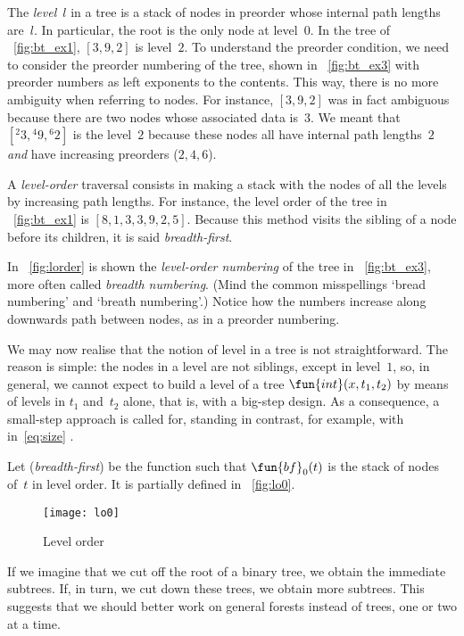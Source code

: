
The \emph{level}~\(l\) in a tree is a stack of nodes
in preorder whose internal path lengths
are~\(l\). In particular, the root is
the only node at level~\(0\). In the tree of \fig~\vref{fig:bt_ex1},
\([3,9,2]\) is level~\(2\). To understand the preorder condition, we
need to consider the preorder numbering of the tree, shown in
\fig~\vref{fig:bt_ex3} with preorder numbers as left exponents to the
contents. This way, there is no more ambiguity when referring to
nodes. For instance, \([3,9,2]\) was in fact ambiguous because there
are two nodes whose associated data is~\(3\). We meant that
\([{}^{2}{3}, {}^{4}{9}, {}^{6}{2}]\) is the level~\(2\) because these
nodes all have internal path lengths~\(2\) \emph{and} have increasing
preorders (\(2,4,6\)).

A \emph{level-order} traversal consists
in making a stack with the nodes of all the levels by increasing path
lengths. For instance, the level order of the tree in
\fig~\vref{fig:bt_ex1} is \([8,1,3,3,9,2,5]\). Because this method
visits the sibling of a node before its children, it is said
\emph{breadth\hyp{}first}.

In \fig~\vref{fig:lorder} is shown the \emph{level\hyp{}order
  numbering} of the tree in \fig~\vref{fig:bt_ex3}, more often called
\emph{breadth numbering}.   (Mind
the common misspellings `bread numbering' and `breath numbering'.)
Notice how the numbers increase along downwards path between nodes, as
in a preorder numbering.

We may now realise that the notion of level in a tree is not
straightforward. The reason is simple: the nodes in a level are not
siblings, except in level~\(1\), so, in
general, we cannot expect to build a level of a tree
\(\fun{int}(x,t_1,t_2)\) by means of levels in \(t_1\) and~\(t_2\)
alone, that is, with a big\hyp{}step design. As a consequence, a small\hyp{}step approach is called for,
standing in contrast, for example, with
 in~\eqref{eq:size}
.

Let 
(\emph{breadth\hyp{}first}) be the function such that
\(\fun{bf}_0(t)\) is the stack of nodes of~\(t\) in level order. It is
partially defined in \fig~\vref{fig:lo0}.
\begin{figure}[t]
\centering
\texttt{[image: lo0]}
\caption{Level order }
\label{fig:lo0}
\end{figure}
If we imagine that we cut off the root of a binary tree, we obtain the
immediate subtrees. If, in turn, we cut down these trees, we obtain
more subtrees. This suggests that we should better work on general
forests instead of trees, one or two at a time.

